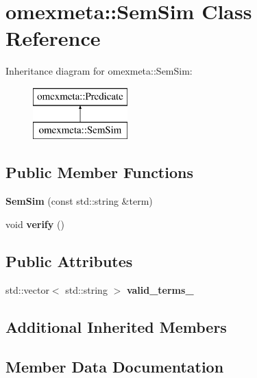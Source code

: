 \hypertarget{classomexmeta_1_1SemSim}{}\section{omexmeta\+:\+:Sem\+Sim Class Reference}
\label{classomexmeta_1_1SemSim}
Inheritance diagram for omexmeta\+:\+:Sem\+Sim\+:\begin{figure}[H]
\begin{center}
\leavevmode
\includegraphics[height=2.000000cm]{classomexmeta_1_1SemSim}
\end{center}
\end{figure}
\subsection*{Public Member Functions}
\begin{DoxyCompactItemize}
\item 
\mbox{\label{classomexmeta_1_1SemSim_a957a762d9f721bfc74f0db91552068a4}} 
{\bfseries Sem\+Sim} (const std\+::string \&term)
\item 
\mbox{\label{classomexmeta_1_1SemSim_a40dcb1f6945bba21cc6927cf78a53e80}} 
void {\bfseries verify} ()
\end{DoxyCompactItemize}
\subsection*{Public Attributes}
\begin{DoxyCompactItemize}
\item 
std\+::vector$<$ std\+::string $>$ {\bfseries valid\+\_\+terms\+\_\+}
\end{DoxyCompactItemize}
\subsection*{Additional Inherited Members}


\subsection{Member Data Documentation}
\mbox{\label{classomexmeta_1_1SemSim_af6e027f353354892e3a26abb9b6f2ece}} 
